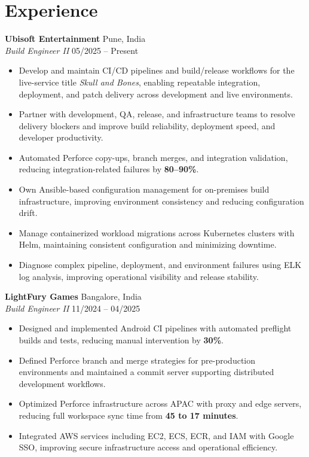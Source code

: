 \section*{Experience}

\textbf{Ubisoft Entertainment} \hfill Pune, India \\
\textit{Build Engineer II} \hfill 05/2025 -- Present
\begin{itemize}
  \item Develop and maintain CI/CD pipelines and build/release workflows for the live-service title \textit{Skull and Bones}, enabling repeatable integration, deployment, and patch delivery across development and live environments.
  \item Partner with development, QA, release, and infrastructure teams to resolve delivery blockers and improve build reliability, deployment speed, and developer productivity.
  \item Automated Perforce copy-ups, branch merges, and integration validation, reducing integration-related failures by \textbf{80--90\%}.
  \item Own Ansible-based configuration management for on-premises build infrastructure, improving environment consistency and reducing configuration drift.
  \item Manage containerized workload migrations across Kubernetes clusters with Helm, maintaining consistent configuration and minimizing downtime.
  \item Diagnose complex pipeline, deployment, and environment failures using ELK log analysis, improving operational visibility and release stability.
\end{itemize}

\vspace{2pt}

\textbf{LightFury Games} \hfill Bangalore, India \\
\textit{Build Engineer II} \hfill 11/2024 -- 04/2025
\begin{itemize}
  \item Designed and implemented Android CI pipelines with automated preflight builds and tests, reducing manual intervention by \textbf{30\%}.
  \item Defined Perforce branch and merge strategies for pre-production environments and maintained a commit server supporting distributed development workflows.
  \item Optimized Perforce infrastructure across APAC with proxy and edge servers, reducing full workspace sync time from \textbf{45 to 17 minutes}.
  \item Integrated AWS services including EC2, ECS, ECR, and IAM with Google SSO, improving secure infrastructure access and operational efficiency.
\end{itemize}

